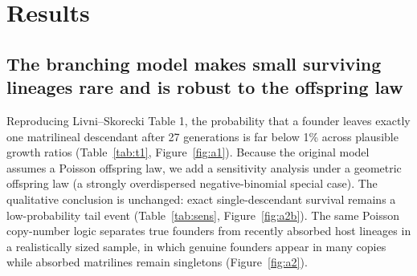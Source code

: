 \documentclass[11pt]{article}
\begin{document}
\section{Results}
\subsection{The branching model makes small surviving lineages rare and is robust to the offspring law}
Reproducing Livni--Skorecki Table 1, the probability that a founder leaves exactly one matrilineal descendant after 27 generations is far below 1\% across plausible growth ratios (Table~\ref{tab:t1}, Figure~\ref{fig:a1}). Because the original model assumes a Poisson offspring law, we add a sensitivity analysis under a geometric offspring law (a strongly overdispersed negative-binomial special case). The qualitative conclusion is unchanged: exact single-descendant survival remains a low-probability tail event (Table~\ref{tab:sens}, Figure~\ref{fig:a2b}). The same Poisson copy-number logic separates true founders from recently absorbed host lineages in a realistically sized sample, in which genuine founders appear in many copies while absorbed matrilines remain singletons (Figure~\ref{fig:a2}).
\end{document}
